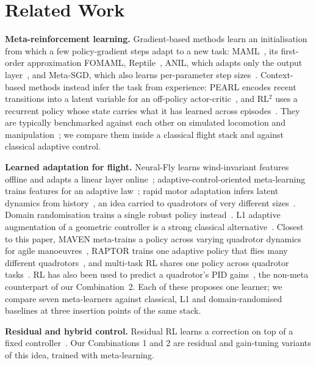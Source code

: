 \section{Related Work}

\textbf{Meta-reinforcement learning.} Gradient-based methods learn an initialisation from which a few policy-gradient steps adapt to a new task: MAML~\cite{finn2017maml}, its first-order approximation FOMAML, Reptile~\cite{nichol2018reptile}, ANIL, which adapts only the output layer~\cite{raghu2020anil}, and Meta-SGD, which also learns per-parameter step sizes~\cite{li2017metasgd}. Context-based methods instead infer the task from experience: PEARL encodes recent transitions into a latent variable for an off-policy actor-critic~\cite{rakelly2019pearl}, and RL$^2$ uses a recurrent policy whose state carries what it has learned across episodes~\cite{duan2016rl2,wang2016learning}. They are typically benchmarked against each other on simulated locomotion and manipulation~\cite{yu2019metaworld,beck2025tutorial}; we compare them inside a classical flight stack and against classical adaptive control.

\textbf{Learned adaptation for flight.} Neural-Fly learns wind-invariant features offline and adapts a linear layer online~\cite{oconnell2022neuralfly}; adaptive-control-oriented meta-learning trains features for an adaptive law~\cite{richards2021acml}; rapid motor adaptation infers latent dynamics from history~\cite{kumar2021rma}, an idea carried to quadrotors of very different sizes~\cite{zhang2022nearhover}. Domain randomisation trains a single robust policy instead~\cite{tobin2017domain,peng2018dynamics,molchanov2019sim2multireal}. L1 adaptive augmentation of a geometric controller is a strong classical alternative~\cite{wu2022l1quad}. Closest to this paper, MAVEN meta-trains a policy across varying quadrotor dynamics for agile manoeuvres~\cite{zhou2026maven}, RAPTOR trains one adaptive policy that flies many different quadrotors~\cite{eschmann2025raptor}, and multi-task RL shares one policy across quadrotor tasks~\cite{xing2024multitask}. RL has also been used to predict a quadrotor's PID gains~\cite{sonmez2025pid}, the non-meta counterpart of our Combination~2. Each of these proposes one learner; we compare seven meta-learners against classical, L1 and domain-randomised baselines at three insertion points of the same stack.

\textbf{Residual and hybrid control.} Residual RL learns a correction on top of a fixed controller~\cite{johannink2019residual,silver2018residual}. Our Combinations 1 and 2 are residual and gain-tuning variants of this idea, trained with meta-learning.

